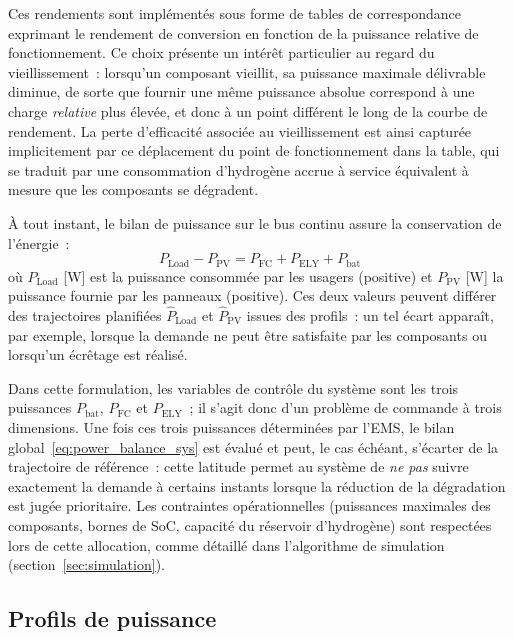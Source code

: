 Ces rendements sont implémentés sous forme de tables de correspondance exprimant le rendement de conversion en fonction de la puissance relative de fonctionnement. Ce choix présente un intérêt particulier au regard du vieillissement~: lorsqu'un composant vieillit, sa puissance maximale délivrable diminue, de sorte que fournir une même puissance absolue correspond à une charge \emph{relative} plus élevée, et donc à un point différent le long de la courbe de rendement. La perte d'efficacité associée au vieillissement est ainsi capturée implicitement par ce déplacement du point de fonctionnement dans la table, qui se traduit par une consommation d'hydrogène accrue à service équivalent à mesure que les composants se dégradent.

À tout instant, le bilan de puissance sur le bus continu assure la conservation de l'énergie~:
\begin{equation}
    \label{eq:power_balance_sys}
    P_{\text{Load}} - P_{\text{PV}} = P_{\text{FC}} + P_{\text{ELY}} + P_{\text{bat}}
\end{equation}
où $P_{\text{Load}}$ [W] est la puissance consommée par les usagers (positive) et $P_{\text{PV}}$ [W] la puissance fournie par les panneaux (positive). Ces deux valeurs peuvent différer des trajectoires planifiées $\hat{P}_{\text{Load}}$ et $\hat{P}_{\text{PV}}$ issues des profils~: un tel écart apparaît, par exemple, lorsque la demande ne peut être satisfaite par les composants ou lorsqu'un écrêtage est réalisé.

Dans cette formulation, les variables de contrôle du système sont les trois puissances $P_{\text{bat}}$, $P_{\text{FC}}$ et $P_{\text{ELY}}$~; il s'agit donc d'un problème de commande à trois dimensions. Une fois ces trois puissances déterminées par l'EMS, le bilan global~\eqref{eq:power_balance_sys} est évalué et peut, le cas échéant, s'écarter de la trajectoire de référence~: cette latitude permet au système de \emph{ne pas} suivre exactement la demande à certains instants lorsque la réduction de la dégradation est jugée prioritaire. Les contraintes opérationnelles (puissances maximales des composants, bornes de SoC, capacité du réservoir d'hydrogène) sont respectées lors de cette allocation, comme détaillé dans l'algorithme de simulation (section~\ref{sec:simulation}).

\subsection{Profils de puissance}
\label{subsec:profils}

